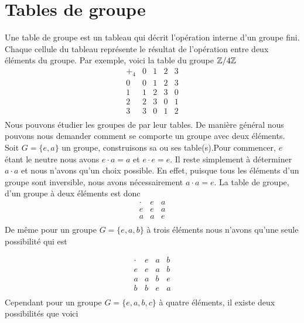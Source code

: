 \section{Tables de groupe}
Une table de groupe est un tableau qui décrit l'opération interne d'un groupe fini. Chaque cellule du tableau représente le résultat de l'opération entre deux éléments du groupe. Par exemple, voici la table du groupe $\mathbb{Z}/4\mathbb{Z}$
\[
\begin{array}{c|cccc}
+_4 & 0 & 1 & 2 & 3 \\ \hline
0 & 0 & 1 & 2 & 3 \\
1 & 1 & 2 & 3 & 0 \\
2 & 2 & 3 & 0 & 1 \\
3 & 3 & 0 & 1 & 2 \\
\end{array}
\]
Nous pouvons étudier les groupes de par leur tables. De manière général nous pouvons nous demander comment se comporte un groupe avec deux éléments. Soit $G=\{e,a\}$ un groupe, construisons sa ou ses table(s).Pour commencer, $e$ étant le neutre nous avons $e\cdot a=a$ et $e\cdot e=e$. Il reste simplement à déterminer $a\cdot a$ et nous n'avons qu'un choix possible. En effet, puisque tous les éléments d'un groupe sont inversible, nous avons nécessairement $a\cdot a=e$. La table de groupe, d'un groupe à deux éléments est donc
\[
\begin{array}{c|cc}
\cdot & e & a \\ \hline
e & e & a \\
a & a & e \\
\end{array}
\]
De même pour un groupe $G=\{e,a,b\}$ à trois éléments nous n'avons qu'une seule possibilité qui est

\[
\begin{array}{c|ccc}
\cdot & e & a & b \\ \hline
 e & e & a & b \\
 a & a & b & e \\
 b & b & e & a \\
\end{array}
\]
Cependant pour un groupe $G=\{e,a,b,c\}$ à quatre éléments, il existe deux possibilités que voici

